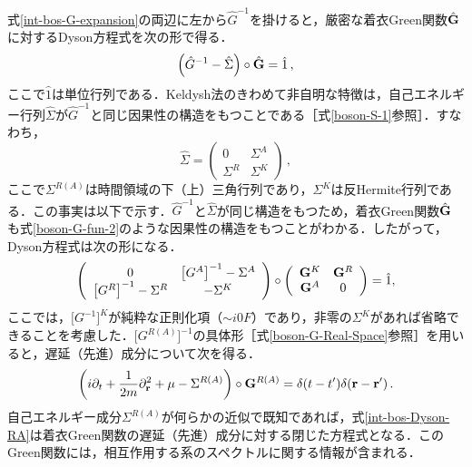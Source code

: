 \documentclass[a4paper,11pt]{ltjsarticle}
\begin{document}
式\eqref{int-bos-G-expansion}の両辺に左から$\hat{G}^{-1}$を掛けると，厳密な着衣Green関数$\hat{{\bf G}}$に対するDyson方程式を次の形で得る．
\begin{equation}\label{int-bos-Dyson}
\left(\hat{G}^{-1} -\hat{\Sigma}\right)\circ \hat{{\bf G}}=\hat 1\, ,
\end{equation}ここで$\hat 1$は単位行列である．Keldysh法のきわめて非自明な特徴は，自己エネルギー行列$\hat{\Sigma}$が$\hat{G}^{-1}$と同じ因果性の構造をもつことである［式\eqref{boson-S-1}参照］．すなわち，
\begin{equation}\label{int-bos-Sigma}
\hat{\Sigma}=\left(\begin{array}{cc}
0   & \Sigma^{A}  \\
  \Sigma^{R}  & \Sigma^K
\end{array}\right)\, ,
\end{equation}ここで$\Sigma^{R(A)}$は時間領域の下（上）三角行列であり，$\Sigma^K$は反Hermite行列である．この事実は以下で示す．$\hat{G}^{-1}$と$\hat{\Sigma}$が同じ構造をもつため，着衣Green関数$\hat{{\bf G}}$も式\eqref{boson-G-fun-2}のような因果性の構造をもつことがわかる．したがって，Dyson方程式は次の形になる．
\begin{equation}\label{int-bos-Dyson-matrix}
\left(\begin{array}{cc}
0   & \big[G^{A}\big]^{-1}- \Sigma^{A}  \\
  \big[G^{R}\big]^{-1}- \Sigma^{R}  & -\Sigma^K
\end{array}\right)\circ
\left(\begin{array}{cc}
{\bf G}^K   & {\bf G}^R  \\
  {\bf G}^A  & 0
\end{array}\right) =\hat 1 ,
\end{equation}ここでは，$\big[G^{-1}\big]^K$が純粋な正則化項（$\sim i0F$）であり，非零の$\Sigma^K$があれば省略できることを考慮した．$\big[G^{R(A)}\big]^{-1}$の具体形［式\eqref{boson-G-Real-Space}参照］を用いると，遅延（先進）成分について次を得る．
\begin{equation}\label{int-bos-Dyson-RA}
\left( i\partial_t + {1\over 2m}\partial_\mathbf{r}^2 +\mu -
\Sigma^{R(A)}\right)\circ {\bf G}^{R(A)} =
\delta(t-t')\delta(\mathbf{r}-\mathbf{r}') \, .
\end{equation}自己エネルギー成分$\Sigma^{R(A)}$が何らかの近似で既知であれば，式\eqref{int-bos-Dyson-RA}は着衣Green関数の遅延（先進）成分に対する閉じた方程式となる．このGreen関数には，相互作用する系のスペクトルに関する情報が含まれる．
\end{document}
